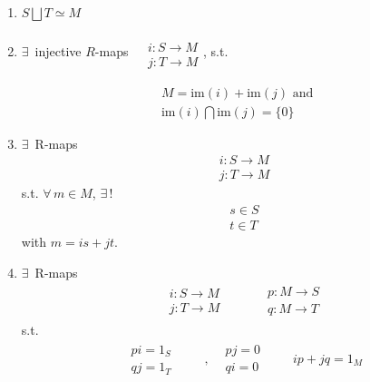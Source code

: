 \begin{proposition}  
\begin{enumerate}
\item[(i)] $S \bigsqcup T \simeq M$ 
\item[(ii)] $\exists \, $ injective $R$-maps $\begin{aligned} & \quad \\ 
	& i : S\to M \\ 
& j :T \to M \end{aligned}$, s.t. 

\begin{equation}
\begin{gathered} 
M = \text{im}(i) + \text{im}(j)  \text{ and } \\ 
\text{im}(i) \bigcap \text{im}(j) = \lbrace 0 \rbrace  
\end{gathered}
\end{equation}
\item[(iii)] $\exists \, $ R-maps 
\[
\begin{aligned}
	& i : S\to M \\ 
	& j : T\to M 
\end{aligned}
\]
s.t. $\forall \, m \in M$, $\exists \, !$ 
\[
\begin{aligned}
	& s \in S \\ 
	& t \in T 
\end{aligned}
\] with $m=is + jt$.  
\item[(iv)] $\exists \, $ R-maps 
\[
\begin{gathered}
\begin{aligned}  & i: S\to M \\ 
& j:T \to M \end{aligned} \qquad \, \begin{aligned}
& p : M \to S \\ 
& q : M \to T \end{aligned}
\end{gathered}
\]
s.t. 
\[
\begin{gathered}
	\begin{aligned}
	& pi = 1_S \\ 
& qj = 1_T 
\end{aligned} \qquad \ , \begin{aligned}
	& pj = 0  \\
	& qi = 0 
\end{aligned} \qquad \, ip + jq = 1_M
\end{gathered}
\]
\end{enumerate}
\end{proposition}

